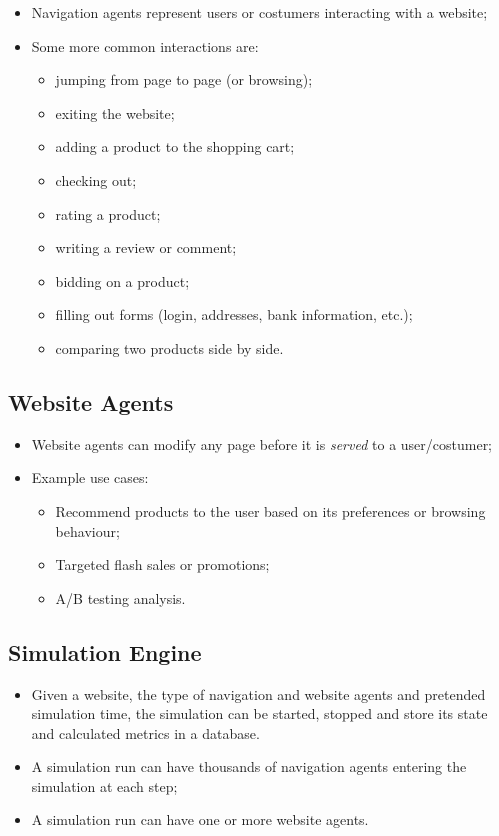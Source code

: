 \begin{itemize}
    \item Navigation agents represent users or costumers interacting with a 
    website;
    \item Some more common interactions are:
    \begin{itemize}
        \item jumping from page to page (or browsing);
        \item exiting the website;
        \item adding a product to the shopping cart;
        \item checking out;
        \item rating a product;
        \item writing a review or comment;
        \item bidding on a product;
        \item filling out forms (login, addresses, bank information, etc.);
        \item comparing two products side by side.
    \end{itemize}
\end{itemize}

\subsection{Website Agents}

\begin{itemize}
    \item Website agents can modify any page before it is \textit{served} to a 
    user/costumer;
    \item Example use cases:
    \begin{itemize}
        \item Recommend products to the user based on its preferences or 
        browsing behaviour;
        \item Targeted flash sales or promotions;
        \item A/B testing analysis.
    \end{itemize}
\end{itemize}

\subsection{Simulation Engine}

\begin{itemize}
    \item Given a website, the type of navigation and website agents and 
    pretended simulation time, the simulation can be started, stopped and store 
    its state and calculated metrics in a database.
    \item A simulation run can have thousands of navigation agents entering the 
    simulation at each step;
    \item A simulation run can have one or more website agents.
\end{itemize}

